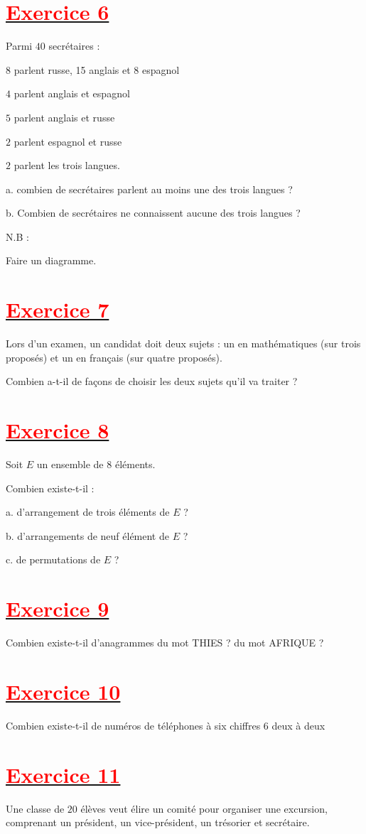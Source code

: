\documentclass[12pt]{article}
\begin{document}
\section*{\underline{\textbf{\textcolor{red}{Exercice 6}}}}
Parmi $40$ secrétaires : 

$8$ parlent russe, 15 anglais et 8 espagnol
 
$4$ parlent anglais et espagnol
 
$5$ parlent anglais et russe
 
$2$ parlent espagnol et russe
 
$2$ parlent les trois langues.
 
a. combien de secrétaires parlent au moins une des trois langues ?
 
b. Combien de secrétaires ne connaissent aucune des trois langues ?

N.B : 

Faire un diagramme.
\section*{\underline{\textbf{\textcolor{red}{Exercice 7}}}}
Lors d'un examen, un candidat doit deux sujets : un en mathématiques (sur trois proposés) et un en français (sur quatre proposés).
 
Combien a-t-il de façons de choisir les deux sujets qu'il va traiter ?
\section*{\underline{\textbf{\textcolor{red}{Exercice 8}}}}
Soit $E$ un ensemble de $8$ éléments.

Combien existe-t-il :

a. d'arrangement de trois éléments de $E$ ?

b. d'arrangements de neuf élément de $E$ ?

c. de permutations de $E$ ?
\section*{\underline{\textbf{\textcolor{red}{Exercice 9}}}}
Combien existe-t-il d'anagrammes du mot THIES ? du mot AFRIQUE ?
\section*{\underline{\textbf{\textcolor{red}{Exercice 10}}}}
Combien existe-t-il de numéros de téléphones à six chiffres $6$ deux à deux
\section*{\underline{\textbf{\textcolor{red}{Exercice 11}}}}
Une classe de $20$ élèves veut élire un comité pour organiser  une excursion, comprenant un président, un vice-président, un trésorier et secrétaire.
\end{document}
